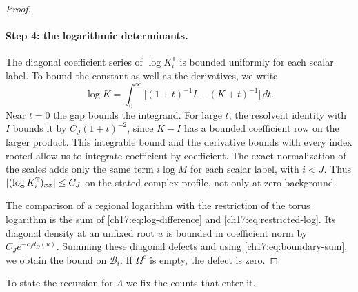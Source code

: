 \begin{proof}
\paragraph{Step 4: the logarithmic determinants.}
The diagonal coefficient series of $\log K_i^{\mathbb T}$ is bounded uniformly for each scalar label. To bound the constant as well as the derivatives, we write
\[
 \log K=\int_0^\infty\bigl[(1+t)^{-1}I-(K+t)^{-1}\bigr]\,dt.
\]
Near $t=0$ the gap bounds the integrand. For large $t$, the resolvent identity with $I$ bounds it by $C_J(1+t)^{-2}$, since $K-I$ has a bounded coefficient row on the larger product. This integrable bound and the derivative bounds with every index rooted allow us to integrate coefficient by coefficient. The exact normalization of the scales adds only the same term $i\log M$ for each scalar label, with $i<J$. Thus $\lvert (\log K_i^{\mathbb T})_{xx}\rvert\le C_J$ on the stated complex profile, not only at zero background.

The comparison of a regional logarithm with the restriction of the torus logarithm is the sum of \eqref{ch17:eq:log-difference} and \eqref{ch17:eq:restricted-log}. Its diagonal density at an unfixed root $u$ is bounded in coefficient norm by $C_Je^{-c_Jd_\Omega(u)}$. Summing these diagonal defects and using \eqref{ch17:eq:boundary-sum}, we obtain the bound on $\mathcal B_i$. If $\Omega^c$ is empty, the defect is zero.
\end{proof}

To state the recursion for $\Lambda$ we fix the counts that enter it.

